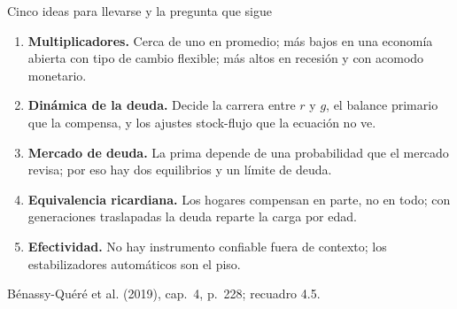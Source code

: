 \documentclass[aspectratio=169,11pt]{beamer}
\newcommand{\fuente}[1]{\par\vfill{\small\color{cGris}#1\par}}
\newcommand{\BQ}{Bénassy-Quéré et al. (2019), cap.~4}
\begin{document}
\begin{frame}{Cinco ideas para llevarse y la pregunta que sigue}
  \small
  \begin{enumerate}
    \item<1-> \textbf{Multiplicadores.} Cerca de uno en promedio; más bajos en una economía abierta con tipo de cambio flexible; más altos en recesión y con acomodo monetario.
    \item<1-> \textbf{Dinámica de la deuda.} Decide la carrera entre $r$ y $g$, el balance primario que la compensa, y los ajustes stock-flujo que la ecuación no ve.
    \item<1-> \textbf{Mercado de deuda.} La prima depende de una probabilidad que el mercado revisa; por eso hay dos equilibrios y un límite de deuda.
    \item<1-> \textbf{Equivalencia ricardiana.} Los hogares compensan en parte, no en todo; con generaciones traslapadas la deuda reparte la carga por edad.
    \item<1-> \textbf{Efectividad.} No hay instrumento confiable fuera de contexto; los estabilizadores automáticos son el piso.
  \end{enumerate}
  \fuente{\BQ, p.~228; recuadro 4.5.}
\end{frame}
\end{document}
